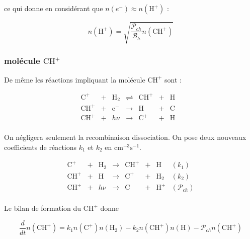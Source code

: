 ce qui donne en considérant que $n(e^-)\approx n(\mathrm{H}^+)$ : 

\begin{equation}
\boxed{
    n(\mathrm{H}^+) = \sqrt{\frac{\mathcal{P}_{ch}}{\mathcal{B}_h}n(\mathrm{CH}^+)}
    }
\end{equation}

\subsubsection{molécule $\mathrm{CH}^+$}

De même les réactions impliquant la molécule $\mathrm{CH}^+$ sont :

\begin{equation}\label{eq:sysH}
    \begin{array}{lllllllr}
        \mathrm{C}^+ & + &\mathrm{H}_2   & \rightleftharpoons &\mathrm{CH}^+  & + & \mathrm{H} &   \\
        \mathrm{CH}^+  & + & \mathrm{e}^-  & \rightarrow &\mathrm{H}   & +  & \mathrm{C} &  \\
        \mathrm{CH}^+  & + & h\nu  & \rightarrow &\mathrm{C}^+   & +  & \mathrm{H} &  \\
    \end{array}
\end{equation}

On négligera seulement la recombinaison dissociation. On pose deux nouveaux coefficients de réactions $k_1$ et $k_2$ en $\mathrm{cm}^{-3}\mathrm{s}^{-1}$.

\begin{equation}
    \begin{array}{lllllllr}
    \mathrm{C}^+ & + & \mathrm{H}_2   & \rightarrow &\mathrm{CH}^+  & + & \mathrm{H} & (k_1) \\
    \mathrm{CH}^+ & + & \mathrm{H}   & \rightarrow &\mathrm{C}^+  & + & \mathrm{H}_2 & (k_2) \\
        \mathrm{CH}^+ & + & h\nu   & \rightarrow &\mathrm{C}  & + & \mathrm{H}^+ & (\mathcal{P}_{ch}) \\
    \end{array}
\end{equation}

Le bilan de formation du $\mathrm{CH}^+$ donne 

\begin{equation}
    \frac{d}{dt}n(\mathrm{CH}^+) = k_1 n(\mathrm{C}^+)n(\mathrm{H}_2) - k_2n(\mathrm{CH}^+)n(\mathrm{H}) -\mathcal{P}_{ch}n(\mathrm{CH}^+) 
\end{equation}

